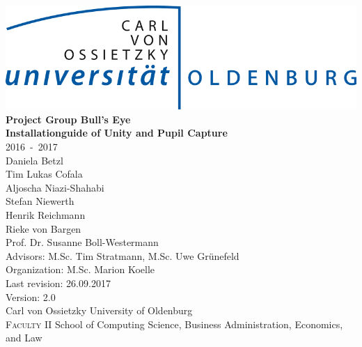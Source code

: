 \documentclass[12pt,a4paper,twoside,openright]{scrreprt}
\begin{document}
\pagestyle{plain}

\begin{titlepage}

	\begin{center}
	\includegraphics[scale=0.3]{LogoUniOL.png}\\[2.2cm]
	\Huge{\textbf{Project Group Bull's Eye}}\\[0.4cm]
	\huge{\textbf{Installationguide of Unity and Pupil Capture}}\\[0.5cm]
	\Large{2016~-~2017}\\[3ex]
	\large{
		Daniela Betzl\\
		Tim Lukas Cofala\\
		Aljoscha Niazi-Shahabi\\
		Stefan Niewerth\\
		Henrik Reichmann\\
		Rieke von Bargen\\
	}
	\vspace{1.5cm}
	\large{
				Prof. Dr. Susanne Boll-Westermann\\
				Advisors: M.Sc. Tim Stratmann, M.Sc. Uwe Gr\"unefeld\\
				Organization: M.Sc. Marion Koelle \\
				Last revision: 26.09.2017\\
				Version: 2.0\\
				Carl von Ossietzky University of Oldenburg\\
				\textsc{Faculty II } School of Computing Science, Business Administration, Economics, and Law 
			}
	\end{center}
\end{titlepage}

\listoftodos

%
\end{document}
